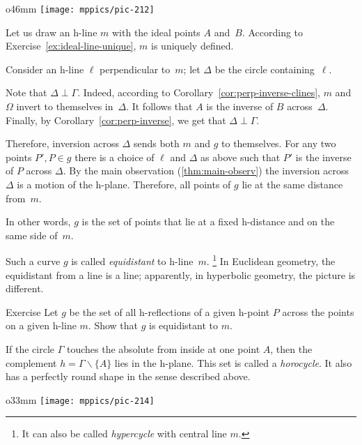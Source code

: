 \begin{wrapfigure}{o}{46mm}
\vskip-0mm
\centering
\texttt{[image: mppics/pic-212]}
\end{wrapfigure}

Let us draw an h-line $m$ with the ideal points $A$ and~$B$.
According to Exercise~\ref{ex:ideal-line-unique}, $m$ is uniquely defined.

Consider an h-line $\ell$ perpendicular to~$m$;
let $\Delta$ be the circle containing~$\ell$.

Note that $\Delta\perp \Gamma$.
Indeed,
according to Corollary~\ref{cor:perp-inverse-clines}, $m$ and $\Omega$ invert to themselves in~$\Delta$.
It follows that $A$ is the inverse of $B$ across~$\Delta$.
Finally, by Corollary~\ref{cor:perp-inverse}, we get that $\Delta\perp \Gamma$.

Therefore, inversion across $\Delta$ sends both $m$ and $g$ to themselves.
For any two points $P',P\in g$ there is a choice of $\ell$ and $\Delta$ as above such that
$P'$ is the inverse of $P$ across $\Delta$.
By the main observation (\ref{thm:main-observ}) the inversion across $\Delta$ is a motion of the h-plane. Therefore, all points of $g$ lie at the same distance from~$m$.

In other words, $g$ is the set of points that lie at a fixed h-distance and on the same side of~$m$.

Such a curve $g$ is called 
\emph{equidistant} to h-line~$m$.%
\footnote{It can also be called \emph{hypercycle} with central line $m$.}
In Euclidean geometry, the equidistant from a line is a line;
apparently, in hyperbolic geometry, the picture is different.

\begin{thm}{Exercise}\label{ex:equidistant-reflection}
Let $g$ be the set of all h-reflections of a given h-point $P$ across the points on a given h-line $m$.
Show that $g$ is equidistant to $m$.
\end{thm}


If the circle $\Gamma$ touches the absolute from inside at one point $A$, then the complement $h=\Gamma\backslash\{A\}$ lies in the h-plane.
This set is called a \emph{horocycle}.
It also has a perfectly round shape in the sense described above.

\begin{wrapfigure}{o}{33mm}
\vskip-0mm
\centering
\texttt{[image: mppics/pic-214]}
\end{wrapfigure}

